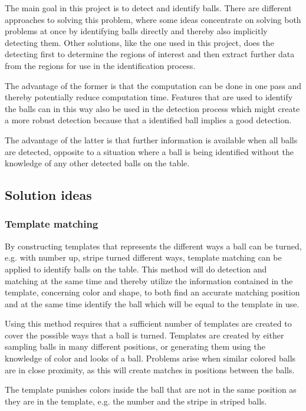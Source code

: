 The main goal in this project is to detect and identify balls. There are different approaches to solving this problem, where some ideas concentrate on solving both problems at once by identifying balls directly and thereby also implicitly detecting them. Other solutions, like the one used in this project, does the detecting first to determine the regions of interest and then extract further data from the regions for use in the identification process.

The advantage of the former is that the computation can be done in one pass and thereby potentially reduce computation time. Features that are used to identify the balls can in this way also be used in the detection process which might create a more robust detection because that a identified ball implies a good detection.

The advantage of the latter is that further information is available when all balls are detected, opposite to a situation where a ball is being identified without the knowledge of any other detected balls on the table.

\subsection{Solution ideas}

\subsubsection{Template matching}
By constructing templates that represents the different ways a ball can be turned, e.g. with number up, stripe turned different ways, template matching can be applied to identify balls on the table. This method will do detection and matching at the same time and thereby utilize the information contained in the template, concerning color and shape, to both find an accurate matching position and at the same time identify the ball which will be equal to the template in use.

Using this method requires that a sufficient number of templates are created to cover the possible ways that a ball is turned. Templates are created by either sampling balls in many different positions, or generating them using the knowledge of color and looks of a ball. Problems arise when similar colored balls are in close proximity, as this will create matches in positions between the balls.

The template punishes colors inside the ball that are not in the same position as they are in the template, e.g. the number and the stripe in striped balls. 

